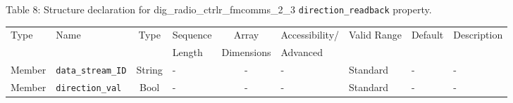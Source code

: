\documentclass{article}
\def\comp{dig\_radio\_ctrlr\_fmcomms\_2\_3}
\begin{document}
\begin{landscape}
	\noindent Table \hypertarget{tab8}{8}: Structure declaration for \comp{} \verb+direction_readback+ property.
	\begin{scriptsize}
		\noindent\begin{longtable}{|p{1.8cm}|p{3.6cm}|c|p{4cm}|c|p{2cm}|p{1.7cm}|p{0.8cm}|p{4.81cm}|}
			\hline
			\rowcolor{blue}
			Type         & Name                                & Type & Sequence & Array      & Accessibility/ & Valid Range  & Default & Description                                                                                                                                                                                                                       \\
			\rowcolor{blue}
			             &                                     &      & Length   & Dimensions & Advanced       &              &         &                                                                                                                                                                                                                             \\
			\hline
			Member       & \verb+data_stream_ID+               & String& -       & -          & -              & Standard     & -       & - \\
			\hline
			Member       & \verb+direction_val+                & Bool& -       & -          & -              & Standard & -       & - \\
			\hline
		\end{longtable}
	\end{scriptsize}




\end{landscape}
\end{document}
